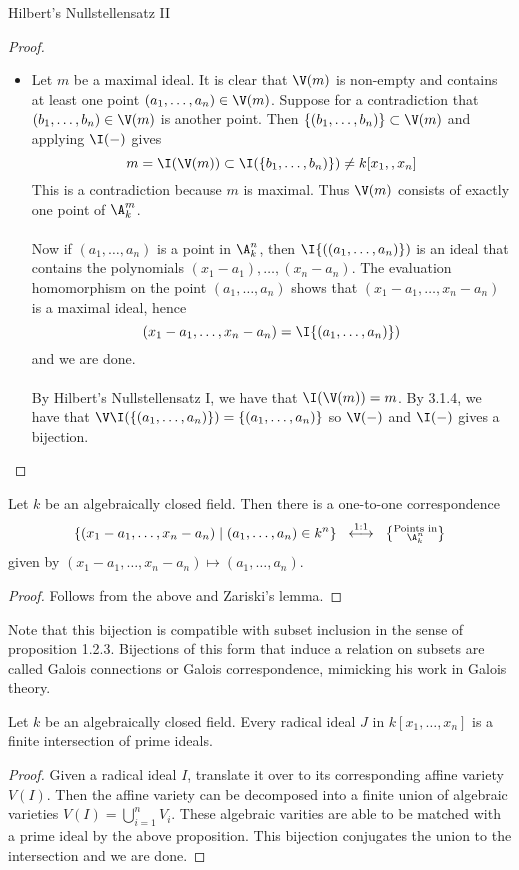 \documentclass[a4paper]{article}
\begin{document}
\begin{thm}{Hilbert's Nullstellensatz II}{}
\begin{proof}
\begin{itemize}
\item Let $m$ be a maximal ideal. It is clear that $\V(m)$ is non-empty and contains at least one point $(a_1,\dots,a_n)\in\V(m)$. Suppose for a contradiction that $(b_1,\dots,b_n)\in\V(m)$ is another point. Then $\{(b_1,\dots,b_n)\}\subset\V(m)$ and applying $\I(-)$ gives $$m=\I(\V(m))\subset\I(\{b_1,\dots,b_n)\})\neq k[x_1,\do,x_n]$$ This is a contradiction because $m$ is maximal. Thus $\V(m)$ consists of exactly one point of $\A_k^m$. \\~\\

Now if $(a_1,\dots,a_n)$ is a point in $\A_k^n$, then $\I\{((a_1,\dots,a_n)\})$ is an ideal that contains the polynomials $(x_1-a_1),\dots,(x_n-a_n)$. The evaluation homomorphism on the point $(a_1,\dots,a_n)$ shows that $(x_1-a_1,\dots,x_n-a_n)$ is a maximal ideal, hence $$(x_1-a_1,\dots,x_n-a_n)=\I\{(a_1,\dots,a_n)\})$$ and we are done. \\~\\

By Hilbert's Nullstellensatz I, we have that $\I(\V(m))=m$. By 3.1.4, we have that $\V\I(\{(a_1,\dots,a_n)\})=\{(a_1,\dots,a_n)\}$ so $\V(-)$ and $\I(-)$ gives a bijection. 
\end{itemize}
\end{proof}
\end{thm}

\begin{lmm}{}{} Let $k$ be an algebraically closed field. Then there is a one-to-one correspondence $$\{(x_1-a_1,\dots,x_n-a_n)\;|\;(a_1,\dots,a_n)\in k^n\}\;\;\overset{\text{1:1}}{\longleftrightarrow}\;\;\left\{\substack{\text{Points in}\\\A_k^n}\right\}$$ given by $(x_1-a_1,\dots,x_n-a_n)\mapsto(a_1,\dots,a_n)$. 
\begin{proof}
Follows from the above and Zariski's lemma. 
\end{proof}
\end{lmm}

Note that this bijection is compatible with subset inclusion in the sense of proposition 1.2.3. Bijections of this form that induce a relation on subsets are called Galois connections or Galois correspondence, mimicking his work in Galois theory. 

\begin{prp}{}{} Let $k$ be an algebraically closed field. Every radical ideal $J$ in $k[x_1,\dots,x_n]$ is a finite intersection of prime ideals. 
\begin{proof}
Given a radical ideal $I$, translate it over to its corresponding affine variety $V(I)$. Then the affine variety can be decomposed into a finite union of algebraic varieties $V(I)=\bigcup_{i=1}^nV_i$. These algebraic varities are able to be matched with a prime ideal by the above proposition. This bijection conjugates the union to the intersection and we are done. 
\end{proof}
\end{prp}
\end{document}
